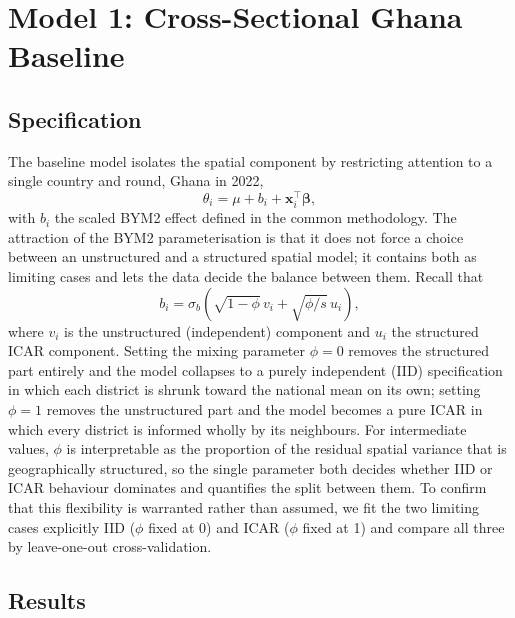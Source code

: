 \documentclass{article}
\begin{document}
\section{Model 1: Cross-Sectional Ghana Baseline}\label{sec:m1}

\subsection{Specification}\label{specification}

The baseline model isolates the spatial component by restricting
attention to a single country and round, Ghana in 2022, \begin{equation}
\theta_i = \mu + b_i + \mathbf{x}_i^{\top}\bm{\beta},
\end{equation} with \(b_i\) the scaled BYM2 effect defined in the common
methodology. The attraction of the BYM2 parameterisation is that it does
not force a choice between an unstructured and a structured spatial
model; it contains both as limiting cases and lets the data decide the
balance between them. Recall that \begin{equation}
b_i = \sigma_b\!\left(\sqrt{1-\phi}\, v_i + \sqrt{\phi/s}\, u_i\right),
\end{equation} where \(v_i\) is the unstructured (independent) component
and \(u_i\) the structured ICAR component. Setting the mixing parameter
\(\phi = 0\) removes the structured part entirely and the model
collapses to a purely independent (IID) specification in which each
district is shrunk toward the national mean on its own; setting
\(\phi = 1\) removes the unstructured part and the model becomes a pure
ICAR in which every district is informed wholly by its neighbours. For
intermediate values, \(\phi\) is interpretable as the proportion of the
residual spatial variance that is geographically structured, so the
single parameter both decides whether IID or ICAR behaviour dominates
and quantifies the split between them. To confirm that this flexibility
is warranted rather than assumed, we fit the two limiting cases
explicitly IID (\(\phi\) fixed at 0) and ICAR (\(\phi\) fixed at 1) and
compare all three by leave-one-out cross-validation.

\subsection{Results}\label{results}
\end{document}
